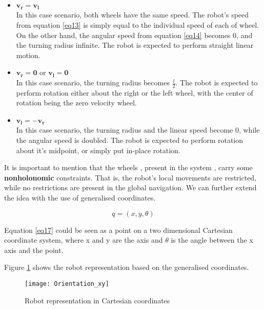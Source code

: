 \begin{itemize}

\item $\boldsymbol{v_r = v_l}$ \\ In this case scenario, both wheels have the same speed. The robot's speed from equation \ref{eq13} is simply equal to the individual speed of each of wheel. On the other hand, the angular speed from equation \ref{eq14} becomes 0, and the turning radius infinite. The robot is expected to perform straight linear motion.

\item $\boldsymbol{v_r = 0}$ or $\boldsymbol{v_l = 0}$ \\ In this case scenario, the turning radius becomes $\frac{l}{2}$. The robot is expected to perform rotation either about the right or the left wheel, with the center of rotation being the zero velocity wheel. 

\item $\boldsymbol{v_l = -v_r}$ \\ In this case scenario, the turning radius and the linear speed become 0, while the angular speed is doubled. The robot is expected to perform rotation about it's midpoint, or simply put in-place rotation.

\end{itemize}

It is important to mention that the wheels , present in the system , carry some \textbf{nonholonomic} constraints. That is, the robot's local movements are restricted, while no restrictions are present in the global navigation. We can further extend the idea with the use of generalised coordinates.

\begin{equation} \label{eq17}
q = (x,y,\theta) 
\end{equation}

Equation \ref{eq17} could be seen as a point on a two dimensional Cartesian coordinate system, where x and y are the axis and $\theta$ is the angle between the x axis and the point. 

Figure \ref{fig::orientation} shows the robot representation based on the generalised coordinates.

\begin{figure}[h]
\centering
\texttt{[image: Orientation\_xy]}
\caption{Robot representation in Cartesian coordinates}
\label{fig::orientation}
\end{figure}

